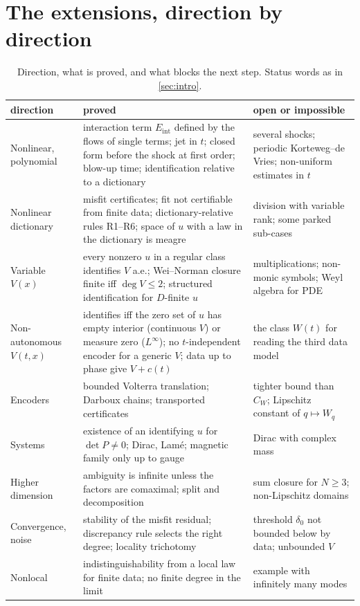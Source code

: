 \documentclass[11pt]{article}
\theoremstyle{plain}
\theoremstyle{definition}
\theoremstyle{remark}
\begin{document}
\section{The extensions, direction by direction}\label{sec:directions}
\begin{table}[tbp]
\centering\small
\caption{Direction, what is proved, and what blocks the next step. Status words as in \cref{sec:intro}.}\label{tab:directions}
\begin{tabular}{@{}p{2.5cm}p{5.6cm}p{4.2cm}@{}}
\toprule
direction & proved & open or impossible\\
\midrule
Nonlinear, polynomial & interaction term $E_{\mathrm{int}}$ defined by the flows of single terms; jet in $t$; closed form before the shock at first order; blow-up time; identification relative to a dictionary & several shocks; periodic Korteweg--de Vries; non-uniform estimates in $t$\\
Nonlinear dictionary & misfit certificates; fit not certifiable from finite data; dictionary-relative rules R1--R6; space of $u$ with a law in the dictionary is meagre & division with variable rank; some parked sub-cases\\
Variable $V(x)$ & every nonzero $u$ in a regular class identifies $V$ a.e.; Wei--Norman closure finite iff $\deg V\le2$; structured identification for $D$-finite $u$ & multiplications; non-monic symbols; Weyl algebra for PDE\\
Non-autonomous $V(t,x)$ & identifies iff the zero set of $u$ has empty interior (continuous $V$) or measure zero ($L^\infty$); no $t$-independent encoder for a generic $V$; data up to phase give $V+c(t)$ & the class $W(t)$ for reading the third data model\\
Encoders & bounded Volterra translation; Darboux chains; transported certificates & tighter bound than $C_W$; Lipschitz constant of $q\mapsto W_q$\\
Systems & existence of an identifying $u$ for $\det P\neq0$; Dirac, Lam\'e; magnetic family only up to gauge & Dirac with complex mass\\
Higher dimension & ambiguity is infinite unless the factors are comaximal; split and decomposition & sum closure for $N\ge3$; non-Lipschitz domains\\
Convergence, noise & stability of the misfit residual; discrepancy rule selects the right degree; locality trichotomy & threshold $\delta_0$ not bounded below by data; unbounded $V$\\
Nonlocal & indistinguishability from a local law for finite data; no finite degree in the limit & example with infinitely many modes\\
\bottomrule
\end{tabular}
\end{table}
\end{document}
